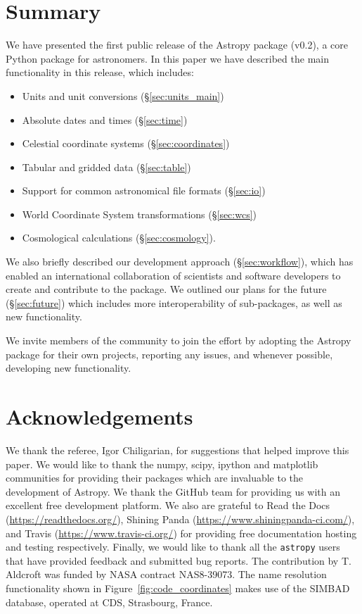 \documentclass[traditabstract]{aa}
\newcommand{\astropy}{\texttt{astropy}\xspace}
\begin{document}
\section{Summary}

\label{sec:summary}

We have presented the first public release of the Astropy package (v0.2), a
core Python package for astronomers. In this paper we have described the main
functionality in this release, which includes:

\begin{itemize}
\item Units and unit conversions (\S\ref{sec:units_main})
\item Absolute dates and times (\S\ref{sec:time})
\item Celestial coordinate systems (\S\ref{sec:coordinates})
\item Tabular and gridded data (\S\ref{sec:table})
\item Support for common astronomical file formats (\S\ref{sec:io})
\item World Coordinate System transformations (\S\ref{sec:wcs})
\item Cosmological calculations (\S\ref{sec:cosmology}).
\end{itemize}

We also briefly described our development approach (\S\ref{sec:workflow}),
which has enabled an international collaboration of scientists and software
developers to create and contribute to the package. We outlined our plans for
the future (\S\ref{sec:future}) which includes more interoperability of
sub-packages, as well as new functionality.

We invite members of the community to join the effort by adopting the Astropy package for
their own projects, reporting any issues, and whenever possible, developing new
functionality.


\section*{Acknowledgements}

\label{sec:acknowledgements}

We thank the referee, Igor Chiligarian, for suggestions that helped improve this paper.
We would like to thank the \gls{numpy}, \gls{scipy}, \gls{ipython} and
\gls{matplotlib} communities for providing their packages which are invaluable
to the development of Astropy. We thank the GitHub team for providing us with
an excellent free development platform. We also are grateful to Read the Docs
(\url{https://readthedocs.org/}), Shining Panda
(\url{https://www.shiningpanda-ci.com/}), and Travis
(\url{https://www.travis-ci.org/}) for providing free documentation
hosting and testing respectively. Finally, we would like to thank all the
\astropy users that have provided feedback and submitted bug reports.
The contribution by T. Aldcroft was funded by NASA contract NAS8-39073.
The name resolution functionality shown in
Figure~\ref{fig:code_coordinates} makes use of the SIMBAD database, operated
at CDS, Strasbourg, France.



\end{document}
